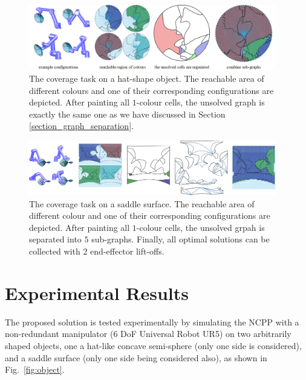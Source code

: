 \documentclass[conference]{IEEEtran}
\begin{document}
\begin{figure}[t]
\centering
\includegraphics[width=0.96\textwidth]{figures/hat_exp/fig_hat_2}
\caption{The coverage task on a hat-shape object. The reachable area of different colours and one of their corresponding configurations are depicted. After painting all $1$-colour cells, the unsolved graph is exactly the same one as we have discussed in Section \ref{section_graph_separation}. }\label{fig:hat}
\end{figure}
\begin{figure}[t]
\centering
\includegraphics[width=0.96\textwidth]{figures/saddle_exp/comb}
\caption{The coverage task on a saddle surface. The reachable area of different colour and one of their corresponding configurations are depicted. After painting all $1$-colour cells, the unsolved grpah is separated into $5$ sub-graphs. Finally, all optimal solutions can be collected with 2 end-effector lift-offs.    }
\label{fig:saddle}
\end{figure}

\section{Experimental Results}\label{section_experiment}
\label{section_results}

The proposed solution is tested experimentally by simulating the NCPP with a non-redundant manipulator (6 DoF Universal Robot UR5) on two arbitrarily shaped objects, one a hat-like concave semi-sphere (only one side is considered), and a saddle surface (only one side being considered also), as shown in Fig.~\ref{fig:object}.
\end{document}
